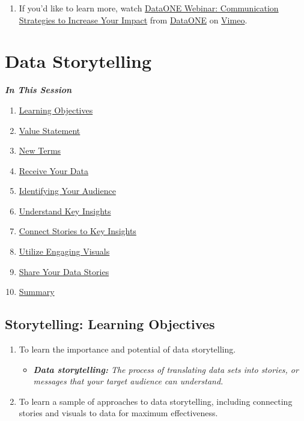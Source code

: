 \documentclass[
]{book}
\providecommand{\tightlist}{%
  \setlength{\itemsep}{0pt}\setlength{\parskip}{0pt}}
\begin{document}
\begin{enumerate}
\def\labelenumi{\arabic{enumi}.}
\tightlist
\item
  If you'd like to learn more, watch \href{https://vimeo.com/323261612}{DataONE Webinar: Communication Strategies to Increase Your Impact} from \href{https://vimeo.com/dataoneorg}{DataONE} on \href{https://vimeo.com/}{Vimeo}.
\end{enumerate}

\hypertarget{data-storytelling}{%
\section{Data Storytelling}\label{data-storytelling}}

\textbf{\emph{In This Session}}

\begin{enumerate}
\def\labelenumi{\arabic{enumi}.}
\tightlist
\item
  \protect\hyperlink{storytelling-learning-objectives}{Learning Objectives}
\item
  \protect\hyperlink{storytelling-value-statement}{Value Statement}
\item
  \protect\hyperlink{new-terms}{New Terms}
\item
  \protect\hyperlink{receive-your-data}{Receive Your Data}
\item
  \protect\hyperlink{identify-your-audience}{Identifying Your Audience}
\item
  \protect\hyperlink{understand-key-insights}{Understand Key Insights}
\item
  \protect\hyperlink{connect-stories-to-key-insights}{Connect Stories to Key Insights}
\item
  \protect\hyperlink{utilize-engaging-visuals}{Utilize Engaging Visuals}
\item
  \protect\hyperlink{share-your-data-stories}{Share Your Data Stories}
\item
  \protect\hyperlink{data-storytelling-summary}{Summary}
\end{enumerate}

\hypertarget{storytelling-learning-objectives}{%
\subsection{Storytelling: Learning Objectives}\label{storytelling-learning-objectives}}

\begin{enumerate}
\def\labelenumi{\arabic{enumi}.}
\tightlist
\item
  To learn the importance and potential of data storytelling.

  \begin{itemize}
  \tightlist
  \item
    \emph{\textbf{Data storytelling:} The process of translating data sets into stories, or messages that your target audience can understand.}
  \end{itemize}
\item
  To learn a sample of approaches to data storytelling, including connecting stories and visuals to data for maximum effectiveness.
\end{enumerate}
\end{document}
